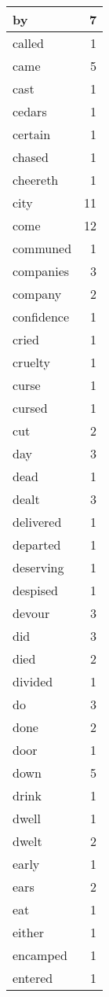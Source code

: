\begin{center}
\begin{longtable}{l|r}
by & 7\\ \hline 
called & 1\\ \hline 
came & 5\\ \hline 
cast & 1\\ \hline 
cedars & 1\\ \hline 
certain & 1\\ \hline 
chased & 1\\ \hline 
cheereth & 1\\ \hline 
city & 11\\ \hline 
come & 12\\ \hline 
communed & 1\\ \hline 
companies & 3\\ \hline 
company & 2\\ \hline 
confidence & 1\\ \hline 
cried & 1\\ \hline 
cruelty & 1\\ \hline 
curse & 1\\ \hline 
cursed & 1\\ \hline 
cut & 2\\ \hline 
day & 3\\ \hline 
dead & 1\\ \hline 
dealt & 3\\ \hline 
delivered & 1\\ \hline 
departed & 1\\ \hline 
deserving & 1\\ \hline 
despised & 1\\ \hline 
devour & 3\\ \hline 
did & 3\\ \hline 
died & 2\\ \hline 
divided & 1\\ \hline 
do & 3\\ \hline 
done & 2\\ \hline 
door & 1\\ \hline 
down & 5\\ \hline 
drink & 1\\ \hline 
dwell & 1\\ \hline 
dwelt & 2\\ \hline 
early & 1\\ \hline 
ears & 2\\ \hline 
eat & 1\\ \hline 
either & 1\\ \hline 
encamped & 1\\ \hline 
entered & 1\\ \hline 

\end{longtable}
\end{center}
